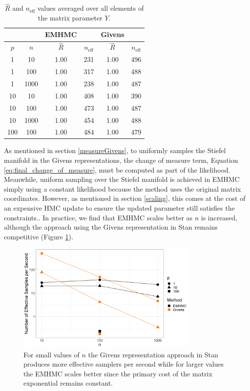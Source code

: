 \documentclass[ba]{imsart}
\numberwithin{equation}{section}
\theoremstyle{plain}
\begin{document}
\begin{table}
\begin{tabular}{|cc||cc|cc|}
\hline
& & EMHMC & & Givens &\\
\hline
$p$ & $n$  & $\hat{R}$ & $n_{\mathrm{eff}}$ & $\hat{R}$ & $n_{\mathrm{eff}}$\\
\hline
\hline
1 & 10 & 1.00 & 231 & 1.00 & 496\\
1 & 100 & 1.00 & 317 & 1.00 & 488\\
1 & 1000 & 1.00 & 238 & 1.00 & 487 \\
\hline
10 & 10 & 1.00 & 408 & 1.00  & 390\\
10 & 100 & 1.00 & 473 & 1.00 & 487\\
10 & 1000 & 1.00 & 454 & 1.00  & 488 \\
\hline
100 & 100 & 1.00 & 484 & 1.00 & 479 \\
\hline
\end{tabular}
\caption{$\hat{R}$ and $n_{\mathrm{eff}}$ values averaged over all elements of the matrix parameter $Y$. }
\label{tab:rhat_neff}
\end{table}

\noindent As mentioned in section \ref{measureGivens}, to uniformly samples the Stiefel manifold in the Givens representations, the change of measure term, Equation \ref{eq:final_change_of_measure}, must be computed as part of the likelihood. Meanwhile, uniform sampling over the Stiefel manifold is achieved in EMHMC simply using a constant likelihood because the method uses the original matrix coordinates. However, as mentioned in section \ref{scaling}, this comes at the cost of an expensive HMC update to ensure the updated parameter still satisfies the constraints.. In practice, we find that EMHMC scales better as $n$ is increased, although the approach using the Givens representation in Stan remains competitive (Figure \ref{fig:scaling}).

\begin{figure}[h]
\centering
\vspace{.1in}
\includegraphics[width=0.8\textwidth]{figures/scaling.png}
\vspace{.05in}
\caption{For small values of $n$ the Givens representation approach in Stan produces more effective samplers per second while for larger values the EMHMC scales better since the primary cost of the matrix exponential remains constant.}
\label{fig:scaling}
\end{figure}
\end{document}
